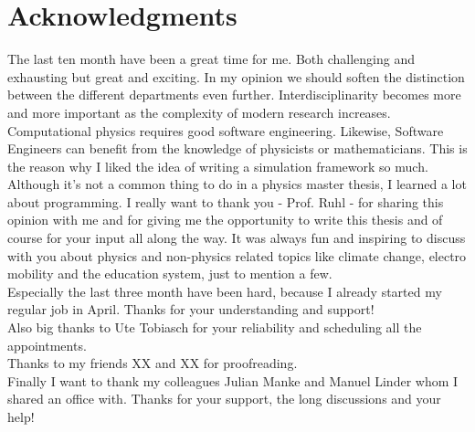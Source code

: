 

\chapter*{Acknowledgments}
The last ten month have been a great time for me. Both challenging and exhausting but great and exciting. In my opinion we should soften the distinction between the different departments even further. Interdisciplinarity becomes more and more important as the complexity of modern research increases. Computational physics requires good software engineering. Likewise, Software Engineers can benefit from the knowledge of physicists or mathematicians. This is the reason why I liked the idea of writing a simulation framework so much. Although it's not a common thing to do in a physics master thesis, I learned a lot about programming. I really want to thank you - Prof. Ruhl - for sharing this opinion with me and for giving me the opportunity to write this thesis and of course for your input all along the way. It was always fun and inspiring to discuss with you about physics and non-physics related topics like climate change, electro mobility and the education system, just to mention a few. \\
Especially the last three month have been hard, because I already started my regular job in April. Thanks for your understanding and support!\\
Also big thanks to Ute Tobiasch for your reliability and scheduling all the appointments.\\
Thanks to my friends XX and XX for proofreading.\\
Finally I want to thank my colleagues Julian Manke and Manuel Linder whom I shared an office with. Thanks for your support, the long discussions and your help! \\


